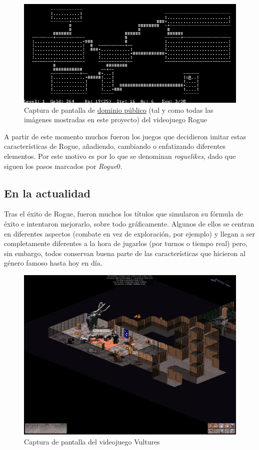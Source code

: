 \begin{figure}[h!]
		\includegraphics[width=\textwidth,height=\textheight,keepaspectratio]{./img/roguegame.PNG}
	\caption{Captura de pantalla de \href{https://en.wikipedia.org/wiki/File:Rogue_Unix_Screenshot_CAR.PNG}{dominio público} (tal y como todas las imágenes mostradas en este proyecto) del videojuego Rogue}
	\label{fig:roguegame}
\end{figure}

A partir de este momento muchos fueron los juegos que decidieron imitar estas características de Rogue, añadiendo, cambiando o enfatizando diferentes elementos. Por este motivo es por lo que se denominan \textit{roguelikes}, dado que siguen los pasos marcados por \textit{Rogue}0.

\subsection{En la actualidad}

Tras el éxito de Rogue, fueron muchos los títulos que simularon su fórmula de éxito e intentaron mejorarlo, sobre todo gráficamente. Algunos de ellos se centran en diferentes aspectos (combate en vez de exploración, por ejemplo) y llegan a ser completamente diferentes a la hora de jugarlos (por turnos o tiempo real) pero, sin embargo, todos conservan buena parte de las características que hicieron al género famoso hasta hoy en día.

\begin{figure}[h!]
		\includegraphics[width=\textwidth,height=\textheight,keepaspectratio]{./img/Vultures.jpg}
	\caption{Captura de pantalla del videojuego Vultures}
	\label{fig:vulturesgame}
\end{figure}

